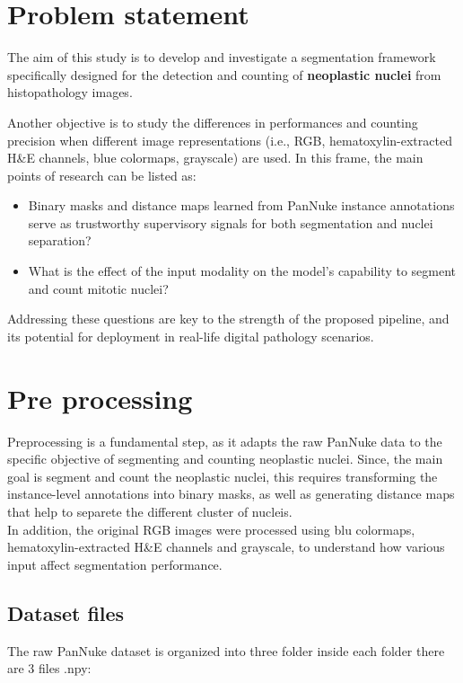 \documentclass[target=bach,aauheader=,style=]{thud}
\begin{document}
\section{Problem statement} The aim of this study is to develop and investigate a segmentation framework specifically designed for the detection and counting of \textbf{neoplastic nuclei} from histopathology images.

Another objective is to study the differences in performances and counting precision when different image representations (i.e., RGB, hematoxylin-extracted H\&E channels, blue colormaps, grayscale) are used. In this frame, the main points of research can be listed as: \begin{itemize} \item Binary masks and distance maps learned from PanNuke instance annotations serve as trustworthy supervisory signals for both segmentation and nuclei separation? \item What is the effect of the input modality on the model's capability to segment and count mitotic nuclei? \end{itemize}

Addressing these questions are key to the strength of the proposed pipeline, and its potential for deployment in real-life digital pathology scenarios.

\section{Pre processing}
Preprocessing is a fundamental step, as it adapts the raw PanNuke data to the specific objective of segmenting and counting neoplastic nuclei. Since, the main goal is segment and count the neoplastic nuclei, this requires transforming the instance-level annotations into binary masks, as well as generating distance maps that help to separete the different cluster of nucleis.\\
In addition, the original RGB images were processed using blu colormaps, hematoxylin-extracted H\&E channels and grayscale, to understand how various input affect segmentation performance.
\subsection{Dataset files}
\label{sec:datafiles}
The raw PanNuke dataset is organized into three folder inside each folder there are 3 files .npy:
\end{document}
